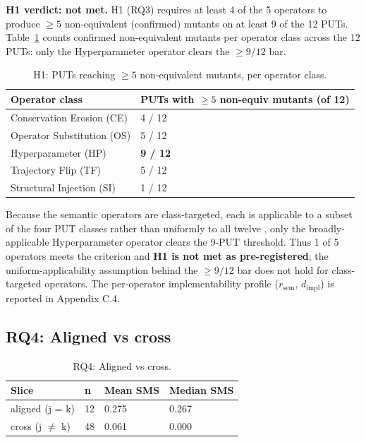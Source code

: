 \documentclass[manuscript,screen,review]{acmart}
\begin{document}
\textbf{H1 verdict: not met.} H1 (RQ3) requires at least 4 of the 5
operators to produce $\geq 5$ non-equivalent (confirmed) mutants on at
least 9 of the 12 PUTs. Table~\ref{tab:p2-32} counts confirmed
non-equivalent mutants per operator class across the 12 PUTs: only the
Hyperparameter operator clears the $\geq 9/12$ bar.

{%
\begin{longtable}[]{@{}ll@{}}
\caption{H1: PUTs reaching $\geq 5$ non-equivalent mutants, per operator
class.}\label{tab:p2-32}\\
\toprule\noalign{}
Operator class & PUTs with $\geq 5$ non-equiv mutants (of 12) \\
\midrule\noalign{}
\endfirsthead
\endhead
\bottomrule\noalign{}
\endlastfoot
Conservation Erosion (CE) & 4 / 12 \\
Operator Substitution (OS) & 5 / 12 \\
Hyperparameter (HP) & \textbf{9 / 12} \\
Trajectory Flip (TF) & 5 / 12 \\
Structural Injection (SI) & 1 / 12 \\
\end{longtable}
}

Because the semantic operators are class-targeted, each is applicable
to a subset of the four PUT classes rather than uniformly to all twelve
, only the broadly-applicable Hyperparameter operator clears the
9-PUT threshold. Thus 1 of 5 operators meets the criterion and
\textbf{H1 is not met as pre-registered}; the uniform-applicability
assumption behind the $\geq 9/12$ bar does not hold for class-targeted
operators. The per-operator implementability profile ($r_{\mathrm{sem}}$,
$d_{\mathrm{impl}}$) is reported in Appendix C.4.

\subsection{RQ4: Aligned vs cross}\label{rq2-aligned-vs-cross-cliffs-delta}

{%
\begin{longtable}[]{@{}llll@{}}
\caption{RQ4: Aligned vs cross.}\label{tab:p2-09}\\
\toprule\noalign{}
Slice & n & Mean SMS & Median SMS \\
\midrule\noalign{}
\endhead
\bottomrule\noalign{}
\endlastfoot
aligned (j = k) & 12 & 0.275 & 0.267 \\
cross (j $\neq$ k) & 48 & 0.061 & 0.000 \\
\end{longtable}
}
\end{document}
